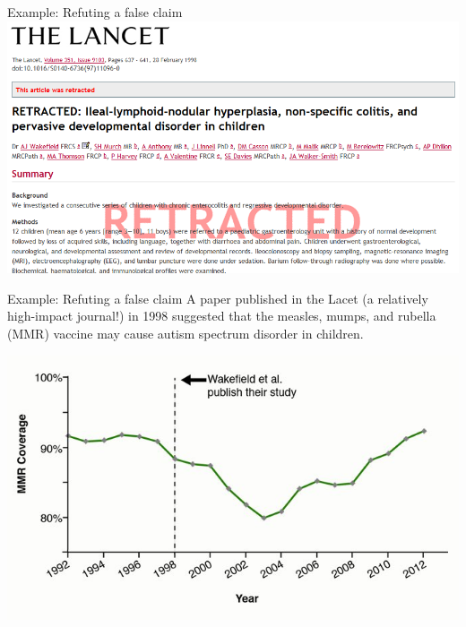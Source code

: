\documentclass[10pt,t]{beamer}
\begin{document}
\begin{frame}[c]{Example: Refuting a false claim}
\centering \includegraphics[scale=0.4]{lancet.png}
\end{frame}

\begin{frame}{Example: Refuting a false claim}
A paper published in the Lacet (a relatively high-impact journal!) in 1998 suggested that the measles, mumps, and rubella (MMR) vaccine may cause autism spectrum disorder in children.

\centering \includegraphics[scale=0.4]{mmrvax.jpg}

\end{frame}
\end{document}
